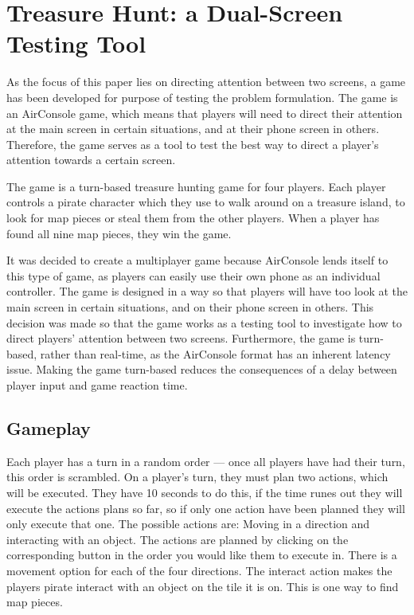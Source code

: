 \chapter{Treasure Hunt: a Dual-Screen Testing Tool}\label{ch:game}
 As the focus of this paper lies on directing attention between two screens, a game has been developed for purpose of testing the problem formulation. The game is an AirConsole game, which means that players will need to direct their attention at the main screen in certain situations, and at their phone screen in others. Therefore, the game serves as a tool to test the best way to direct a player's attention towards a certain screen.

The game is a turn-based treasure hunting game for four players. Each player controls a pirate character which they use to walk around on a treasure island, to look for map pieces or steal them from the other players. When a player has found all nine map pieces, they win the game.

It was decided to create a multiplayer game because AirConsole lends itself to this type of game, as players can easily use their own phone as an individual controller. The game is designed in a way so that players will have too look at the main screen in certain situations, and on their phone screen in others. This decision was made so that the game works as a testing tool to investigate how to direct players' attention between two screens. Furthermore, the game is turn-based, rather than real-time, as the AirConsole format has an inherent latency issue. Making the game turn-based reduces the consequences of a delay between player input and game reaction time. 

\section{Gameplay}
Each player has a turn in a random order --- once all players have had their turn, this order is scrambled. On a player's turn, they must plan two actions, which will be executed. They have 10 seconds to do this, if the time runes out they will execute the actions plans so far, so if only one action have been planned they will only execute that one. The possible actions are: Moving in a direction and interacting with an object. The actions are planned by clicking on the corresponding button in the order you would like them to execute in. There is a movement option for each of the four directions. The interact action makes the players pirate interact with an object on the tile it is on. This is one way to find map pieces. 

